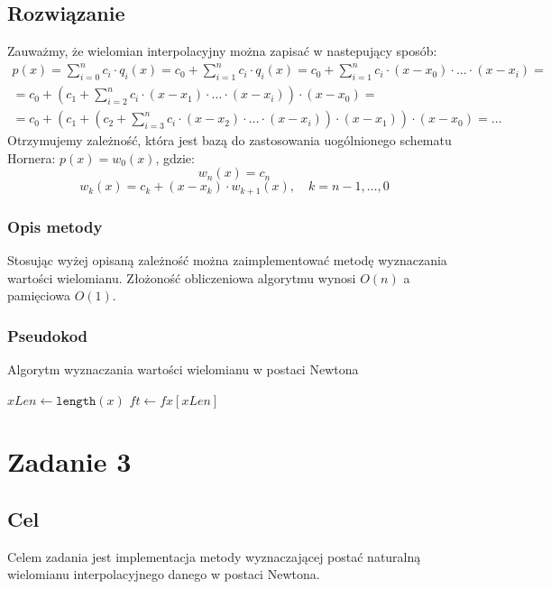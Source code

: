 \documentclass{article}
\begin{document}
\subsection{Rozwiązanie}
Zauważmy, że wielomian interpolacyjny można zapisać w nastepujący sposób:
\begin{gather}
    \nonumber
    p(x) = \sum_{i=0}^{n} c_i \cdot q_i(x) = c_0 + \sum_{i=1}^{n} c_i \cdot q_i(x) = c_0 + \sum_{i=1}^{n} c_i \cdot (x-x_0) \cdot \ldots \cdot (x-x_i) = \\
    \nonumber
    = c_0 + (c_1 + \sum_{i=2}^{n} c_i \cdot (x-x_1) \cdot \ldots \cdot (x-x_i)) \cdot (x-x_0) = \\
    \nonumber
    = c_0 + (c_1 + (c_2 + \sum_{i=3}^{n} c_i \cdot (x-x_2) \cdot \ldots \cdot (x-x_i)) \cdot (x-x_1) ) \cdot (x-x_0) = \ldots
\end{gather}
Otrzymujemy zależność, która jest bazą do zastosowania uogólnionego schematu Hornera: $p(x) = w_0(x)$, gdzie:
\[
w_n(x) = c_n
\]
\[
w_k(x) = c_k + (x-x_k) \cdot w_{k+1}(x), \quad k=n-1, \ldots, 0
\]

\subsubsection{Opis metody}
Stosując wyżej opisaną zależność można zaimplementować metodę wyznaczania wartości wielomianu.
Złożoność obliczeniowa algorytmu wynosi $O(n)$ a pamięciowa $O(1)$.

\subsubsection{Pseudokod}
\begin{algorithm}
    \caption{Algorytm wyznaczania wartości wielomianu w postaci Newtona}
    \DontPrintSemicolon
    $xLen \gets \texttt{length}(x)$\;
    $ft \gets fx[xLen]$\;
    
\end{algorithm}

\newpage

\section{Zadanie 3}
\subsection{Cel}
Celem zadania jest implementacja metody wyznaczającej postać naturalną wielomianu interpolacyjnego danego w postaci Newtona.
\end{document}

